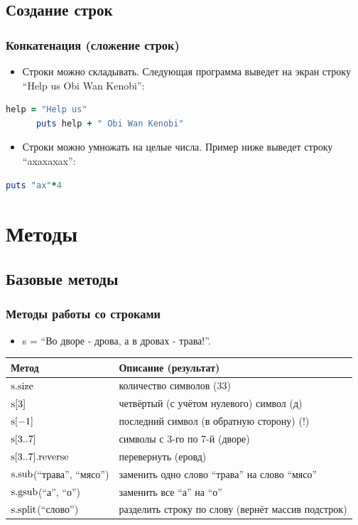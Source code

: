 \documentclass[compress,red]{beamer}
\begin{document}
\subsection{Создание строк}
\begin{frame}[fragile]
  \frametitle{Конкатенация (сложение строк)}
  \begin{itemize}
    \item Строки можно складывать. Следующая программа выведет на экран строку ``Help us Obi Wan Kenobi'':
  \end{itemize}
    \begin{lstlisting}[language=ruby,basicstyle=\footnotesize,label=ruby2,caption=Конкатенация строк]
      help = "Help us"
      puts help + " Obi Wan Kenobi"
    \end{lstlisting}
  \begin{itemize}
    \item Строки можно умножать на целые числа. Пример ниже выведет строку ``axaxaxax'':
  \end{itemize}
  \begin{lstlisting}[language=ruby,basicstyle=\footnotesize,label=ruby3,caption=Умножение строк]
    puts "ax"*4
  \end{lstlisting}
  
\end{frame}

\section{Методы}
\subsection{Базовые методы}
\begin{frame}[fragile]
  \frametitle{Методы работы со строками}
		\begin{itemize}
  	  \item s = ``Во дворе - дрова, а в дровах - трава!''.
		\end{itemize}
		\begin{tabular}{|p{8em}|p{19em}|}
		\hline
		\textbf{Метод} & \textbf{Описание (результат)} \\
		\hline
		$\rm{s.size}$ & количество символов (33) \\
		\hline
		$\rm{s[3]}$ & четвёртый (с учётом нулевого) символ (д) \\
		\hline
		$\rm{s[-1]}$ & последний символ (в обратную сторону) (!) \\
		\hline
		$\rm{s[3..7]}$ & символы с 3-го по 7-й (дворе)\\
		\hline
		$\rm{s[3..7].reverse}$ & перевернуть (еровд) \\
		\hline
		\scriptsize{$\rm{s.sub}$(``трава'', ``мясо'')} & заменить одно слово ``трава'' на слово ``мясо''\\
		\hline
		$\rm{s.gsub}$(``а'', ``о'')} & заменить все ``а'' на ``о''\\
		\hline
		$\rm{s.split}$(``слово'') & разделить строку по слову (вернёт массив подстрок) \\
		\hline
		\end{tabular}
		
\end{frame}
\end{document}
